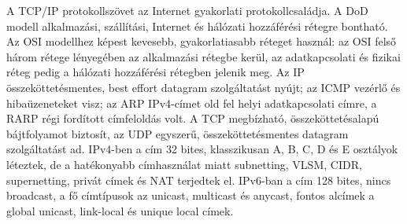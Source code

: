 \begin{summarybox}
A TCP/IP protokollszövet az Internet gyakorlati protokollcsaládja. A DoD modell alkalmazási, szállítási, Internet és hálózati hozzáférési rétegre bontható. Az OSI modellhez képest kevesebb, gyakorlatiasabb réteget használ: az OSI felső három rétege lényegében az alkalmazási rétegbe kerül, az adatkapcsolati és fizikai réteg pedig a hálózati hozzáférési rétegben jelenik meg. Az IP összeköttetésmentes, best effort datagram szolgáltatást nyújt; az ICMP vezérlő és hibaüzeneteket visz; az ARP IPv4-címet old fel helyi adatkapcsolati címre, a RARP régi fordított címfeloldás volt. A TCP megbízható, összeköttetésalapú bájtfolyamot biztosít, az UDP egyszerű, összeköttetésmentes datagram szolgáltatást ad. IPv4-ben a cím 32 bites, klasszikusan A, B, C, D és E osztályok léteztek, de a hatékonyabb címhasználat miatt subnetting, VLSM, CIDR, supernetting, privát címek és NAT terjedtek el. IPv6-ban a cím 128 bites, nincs broadcast, a fő címtípusok az unicast, multicast és anycast, fontos alcímek a global unicast, link-local és unique local címek.
\end{summarybox}
